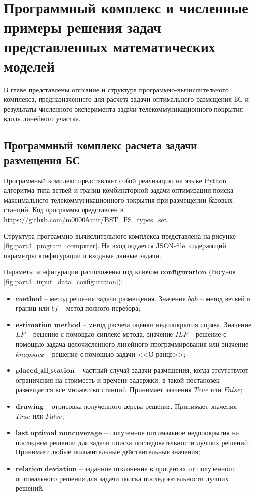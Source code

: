 \chapter{Программный комплекс и численные примеры решения задач представленных математических моделей}\label{part4}

В главе представлены описание и структура программно-вычислительного комплекса, предназначенного для расчета задачи оптимального размещения БС и результаты численного эксперимента задачи телекоммуникационного покрытия вдоль линейного участка.

\section{Программный комплекс расчета задачи размещения БС}

Программный комплекс \cite{progbib_mukhtarpov} представляет собой реализацию на языке Python алгоритма типа ветвей и границ комбинаторной задачи оптимизации поиска максимального телекоммуникационного покрытия при размещении базовых станций. Код программы представлен в \url{https://github.com/m0000Amir/BST_BS_types_set}.

Структура программно-вычислительного комплекса представлена на рисунке \ref{fig:part4_program_computer}. На вход подается JSON-file, содержащий параметры конфигурации и входные данные задачи.

 Параметы конфигурации расположены под ключом $\textbf{configuration}$ (Рисунок \cref{fig:part4_input_data_configuration}):
 \begin{itemize}
   \item $\textbf{method}$ -- метод решения задачи размещения. Значение $\textit{bab}$ -- метод ветвей и границ или $\textit{bf}$  -- метод полного перебора;
   \item $\textbf{estimation\_method}$ -- метод расчета оценки недопокрытия справа. Значение $\textit{LP}$ -- решение с помощью сиплекс-метода, значение $\textit{ILP}$ -- решение с помощью задача целочисленного линейного программирования или значение $\textit{knapsack}$ -- решение с помощью задачи <<О ранце>>;
   \item $\textbf{placed\_all\_station}$ -- частный случай задачи размещения, когда отсутствуют ограничения на стоимость и времени задержки, в такой постановек размещается все множество станций. Принимает значения $\textit{True}$ или $\textit{False}$;
   \item $\textbf{drawing}$ -- отрисовка полученного дерева решения.  Принимает значения $\textit{True}$ или $\textit{False}$;
   \item $\textbf{last\_optimal\_noncoverage}$ -- полученное оптимальное недопокрытия на последнем решении  для задачи поиска последовательности лучших решений. Принимает любые положительные действительные значения;
   \item $\textbf{relation\_deviation}$ -- заданное отклонение в процентах от полученного оптимального решения для задачи поиска последовательности лучших решений.
 \end{itemize}



